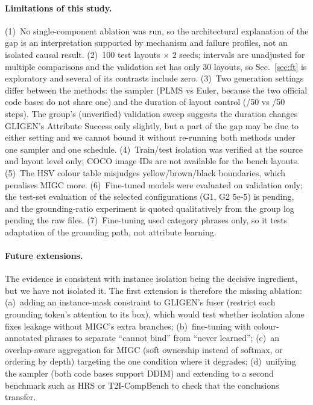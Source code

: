 \documentclass[10pt,twocolumn]{article}
\begin{document}
\paragraph{Limitations of this study.} (1)~No single-component ablation was run, so the architectural explanation of the gap is an interpretation supported by mechanism and failure profiles, not an isolated causal result. (2)~100 test layouts $\times$ 2 seeds; intervals are unadjusted for multiple comparisons and the validation set has only 30 layouts, so Sec.~\ref{sec:ft} is exploratory and several of its contrasts include zero. (3)~Two generation settings differ between the methods: the sampler (PLMS vs Euler, because the two official code bases do not share one) and the duration of layout control (\GligenSteps/50 vs \MigcSteps/50 steps). The group's (unverified) validation sweep suggests the duration changes GLIGEN's Attribute Success only slightly, but a part of the gap may be due to either setting and we cannot bound it without re-running both methods under one sampler and one schedule. (4)~Train/test isolation was verified at the source and layout level only; COCO image IDs are not available for the bench layouts. (5)~The HSV colour table misjudges yellow/brown/black boundaries, which penalises MIGC more. (6)~Fine-tuned models were evaluated on validation only; the test-set evaluation of the selected configurations (G1, G2 5e-5) is pending, and the grounding-ratio experiment is quoted qualitatively from the group log pending the raw files. (7)~Fine-tuning used category phrases only, so it tests adaptation of the grounding path, not attribute learning.

\paragraph{Future extensions.} The evidence is consistent with instance isolation being the decisive ingredient, but we have not isolated it. The first extension is therefore the missing ablation: (a)~adding an instance-mask constraint to GLIGEN's fuser (restrict each grounding token's attention to its box), which would test whether isolation alone fixes leakage without MIGC's extra branches; (b)~fine-tuning with colour-annotated phrases to separate ``cannot bind'' from ``never learned''; (c)~an overlap-aware aggregation for MIGC (soft ownership instead of softmax, or ordering by depth) targeting the one condition where it degrades; (d)~unifying the sampler (both code bases support DDIM) and extending to a second benchmark such as HRS or T2I-CompBench to check that the conclusions transfer.
\end{document}
